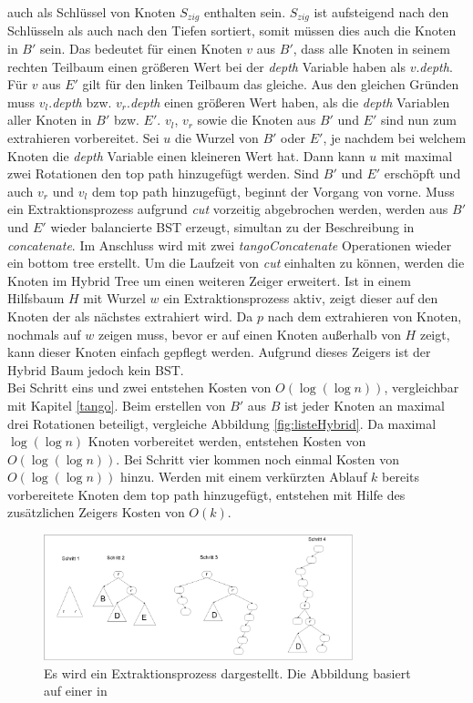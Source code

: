 \documentclass[a4paper,12pt]{article}
\begin{document}
auch als Schlüssel von Knoten $S_{zig}$ enthalten sein.   $S_{zig}$ ist aufsteigend nach den Schlüsseln als auch nach den Tiefen sortiert, somit müssen dies auch die Knoten in $B'$ sein. Das bedeutet für einen Knoten $v$ aus $B'$, dass alle Knoten in seinem rechten Teilbaum einen größeren Wert bei der \textit{depth} Variable haben als $v.$\textit{depth}. Für  $v$ aus $E'$ gilt für den linken Teilbaum das gleiche. Aus den gleichen Gründen muss $v_l.$\textit{depth} bzw. $v_r.$\textit{depth} einen größeren Wert haben, als die \textit{depth} Variablen aller Knoten in $B'$ bzw. $E'$. $v_l$, $v_r$ sowie die Knoten aus $B'$ und $E'$ sind nun zum extrahieren vorbereitet. Sei $u$ die Wurzel von $B'$ oder $E'$, je nachdem bei welchem Knoten die \textit{depth} Variable einen kleineren Wert hat. Dann kann $u$ mit maximal zwei Rotationen den top path hinzugefügt werden. Sind $B'$ und  $E'$ erschöpft und auch $v_r$ und $v_l$ dem top path hinzugefügt, beginnt der Vorgang von vorne. Muss ein Extraktionsprozess aufgrund \textit{cut} vorzeitig abgebrochen werden, werden aus $B'$ und $E'$ wieder balancierte BST erzeugt, simultan zu der Beschreibung in \textit{concatenate}. Im Anschluss wird mit zwei \textit{tangoConcatenate} Operationen wieder ein bottom tree erstellt. Um die Laufzeit von \textit{cut} einhalten zu können, werden die Knoten im Hybrid Tree um einen weiteren Zeiger erweitert. Ist in einem Hilfsbaum $H$ mit Wurzel $w$ ein Extraktionsprozess aktiv, zeigt dieser auf den Knoten der als nächstes extrahiert wird. Da $p$ nach dem extrahieren von Knoten, nochmals auf $w$ zeigen muss, bevor er auf einen Knoten außerhalb von $H$ zeigt, kann dieser Knoten einfach gepflegt werden. Aufgrund dieses Zeigers ist der Hybrid Baum jedoch kein BST.\\
Bei Schritt eins und zwei entstehen Kosten von $O\left(\log \left(\log n\right)\right)$, vergleichbar mit Kapitel \ref{tango}. Beim erstellen von $B'$ aus $B$ ist jeder Knoten an maximal drei Rotationen beteiligt, vergleiche Abbildung \ref{fig:listeHybrid}. Da maximal  $\log\left(\log n\right)$ Knoten vorbereitet werden, entstehen Kosten von  $O\left(\log\left(\log n\right)\right)$. Bei Schritt vier kommen noch einmal Kosten von $O\left(\log\left(\log n\right)\right)$ hinzu.
Werden mit einem verkürzten Ablauf $k$ bereits vorbereitete Knoten dem top path hinzugefügt, entstehen mit Hilfe des zusätzlichen Zeigers Kosten von $O\left(k\right)$.   
\begin{figure}[h]
	\centering
	\includegraphics[width= 0.8\textwidth]{"Medien/Zipper/hybrid/extractHybrid"}
	\caption{Es wird ein Extraktionsprozess dargestellt. Die Abbildung basiert auf einer in \cite{zipper} }
	\label{fig:extractHybrid}
\end{figure}
\end{document}
